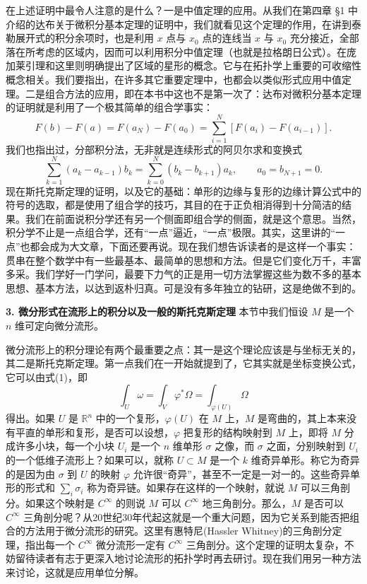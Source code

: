 在上述证明中最令人注意的是什么？一是中值定理的应用。从我们在第四章 §1 中介绍的达布关于微积分基本定理的证明中，我们就看见这个定理的作用，在讲到泰勒展开式的积分余项时，也是利用 $x$ 点与 $x_0$ 点的连线当 $x$ 与 $x_0$ 充分接近，全部落在所考虑的区域内，因而可以利用积分中值定理（也就是拉格朗日公式）。在庞加莱引理和这里则明确提出了区域的星形的概念。它与在拓扑学上重要的可收缩性概念相关。我们要指出，在许多其它重要定理中，也都会以类似形式应用中值定理。二是组合方法的应用，即在本书中这也不是第一次了：达布对微积分基本定理的证明就是利用了一个极其简单的组合学事实：
\[
 F(b)-F(a)=F(a_N)-F(a_0)=\sum_{i=1}^N[F(a_i)-F(a_{i-1})].
\]
我们也指出过，分部积分法，无非就是连续形式的阿贝尔求和变换式
\[
 \sum_{k=1}^N(a_k-a_{k-1})b_k
 =\sum_{k=0}^N(b_k-b_{k+1})a_k,\qquad a_0=b_{N+1}=0.
\]
现在斯托克斯定理的证明，以及它的基础：单形的边缘与复形的边缘计算公式中的符号的选取，都是使用了组合学的技巧，其目的在于正负相消得到十分简洁的结果。我们在前面说积分学还有另一个侧面即组合学的侧面，就是这个意思。当然，积分学不止是一点组合学，还有“一点”逼近，“一点”极限。其实，这里讲的“一点”也都会成为大文章，下面还要再说。现在我们想告诉读者的是这样一个事实：贯串在整个数学中有一些最基本、最简单的思想和方法。但是它们变化万千，丰富多采。我们学好一门学问，最要下力气的正是用一切方法掌握这些为数不多的基本思想、基本方法，以达到返朴归真。可是没有多年独立的钻研，这是绝做不到的。

\noindent\textbf{3. 微分形式在流形上的积分以及一般的斯托克斯定理}\quad
本节中我们恒设 $M$ 是一个 $n$ 维可定向微分流形。

微分流形上的积分理论有两个最重要之点：其一是这个理论应该是与坐标无关的，其二是斯托克斯定理。第一点我们在一开始就提到了，它其实就是坐标变换公式，它可以由式(1)，即
\[
 \int_U\omega=\int_V\varphi^*\Omega=\int_{\varphi(U)}\Omega
\]
得出。如果 $U$ 是 $\mathbb R^n$ 中的一个复形，$\varphi(U)$ 在 $M$ 上，$M$ 是弯曲的，其上本来没有平直的单形和复形，是否可以设想，$\varphi$ 把复形的结构映射到 $M$ 上，即将 $M$ 分成许多小块，每一个小块 $U_i$ 是一个 $n$ 维单形 $\sigma$ 之像，而 $\sigma$ 之面，分别映射到 $U_i$ 的一个低维子流形上？如果可以，就称 $U\subset M$ 是一个 $k$ 维奇异单形。称它为奇异的是因为由 $\sigma$ 到 $U$ 的映射 $\varphi$ 允许很“奇异”，甚至不一定是一对一的。这些奇异单形的形式和 $\sum_i\sigma_i$ 称为奇异链。如果存在这样的一个映射，就说 $M$ 可以三角剖分。如果这个映射是 $C^\infty$ 的则说 $M$ 可以 $C^\infty$ 地三角剖分。那么，$M$ 是否可以 $C^\infty$ 三角剖分呢？从20世纪30年代起这就是一个重大问题，因为它关系到能否把组合的方法用于微分流形的研究。这里有惠特尼(Hassler Whitney)的三角剖分定理，指出每一个 $C^\infty$ 微分流形一定有 $C^\infty$ 三角剖分。这个定理的证明太复杂，不妨留待读者有志于更深入地讨论流形的拓扑学时再去研讨。现在我们用另一种方法来讨论，这就是应用单位分解。

